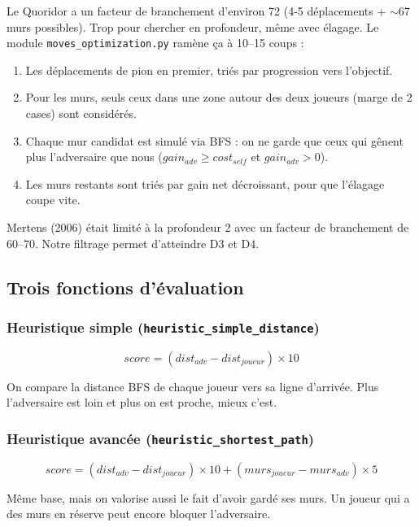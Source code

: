\documentclass[a4paper, 12pt]{report}
\begin{document}
Le Quoridor a un facteur de branchement d'environ 72 (4-5 déplacements + $\sim$67 murs possibles). Trop pour chercher en profondeur, même avec élagage. Le module \texttt{moves\_optimization.py} ramène ça à 10--15 coups :
\begin{enumerate}
    \item Les déplacements de pion en premier, triés par progression vers l'objectif.
    \item Pour les murs, seuls ceux dans une zone autour des deux joueurs (marge de 2 cases) sont considérés.
    \item Chaque mur candidat est simulé via BFS : on ne garde que ceux qui gênent plus l'adversaire que nous ($gain_{adv} \geq cost_{self}$ et $gain_{adv} > 0$).
    \item Les murs restants sont triés par gain net décroissant, pour que l'élagage coupe vite.
\end{enumerate}

Mertens (2006) était limité à la profondeur 2 avec un facteur de branchement de 60--70. Notre filtrage permet d'atteindre D3 et D4.

\subsection{Trois fonctions d'évaluation}

\subsubsection{Heuristique simple (\texttt{heuristic\_simple\_distance})}

\begin{equation}
    score = (dist_{adv} - dist_{joueur}) \times 10
\end{equation}

On compare la distance BFS de chaque joueur vers sa ligne d'arrivée. Plus l'adversaire est loin et plus on est proche, mieux c'est.

\subsubsection{Heuristique avancée (\texttt{heuristic\_shortest\_path})}

\begin{equation}
    score = (dist_{adv} - dist_{joueur}) \times 10 + (murs_{joueur} - murs_{adv}) \times 5
\end{equation}

Même base, mais on valorise aussi le fait d'avoir gardé ses murs. Un joueur qui a des murs en réserve peut encore bloquer l'adversaire.
\end{document}
